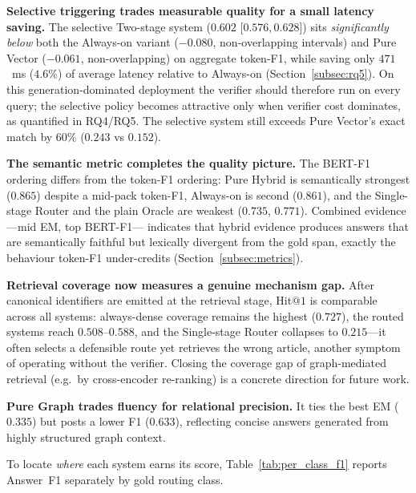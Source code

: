 \documentclass[pdflatex,sn-mathphys-num]{sn-jnl}
\begin{document}
\noindent\textbf{Selective triggering trades measurable quality for a small
latency saving.} The selective Two-stage system ($0.602$
{\scriptsize[$0.576, 0.628$]}) sits \emph{significantly below} both the
Always-on variant ($-0.080$, non-overlapping intervals) and Pure Vector
($-0.061$, non-overlapping) on aggregate token-F1, while saving only
$471$~ms ($4.6\%$) of average latency relative to Always-on
(Section~\ref{subsec:rq5}). On this generation-dominated deployment the
verifier should therefore run on every query; the selective policy becomes
attractive only when verifier cost dominates, as quantified in RQ4/RQ5. The
selective system still exceeds Pure Vector's exact match by $60\%$ ($0.243$
vs $0.152$).

\noindent\textbf{The semantic metric completes the quality picture.} The
BERT-F1 ordering differs from the token-F1 ordering: Pure Hybrid is
semantically strongest ($0.865$) despite a mid-pack token-F1, Always-on is
second ($0.861$), and the Single-stage Router and the plain Oracle are
weakest ($0.735$, $0.771$). Combined evidence---mid EM, top BERT-F1---
indicates that hybrid evidence produces answers that are semantically
faithful but lexically divergent from the gold span, exactly the behaviour
token-F1 under-credits (Section~\ref{subsec:metrics}).

\noindent\textbf{Retrieval coverage now measures a genuine mechanism gap.}
After canonical identifiers are emitted at the retrieval stage, Hit@$1$ is
comparable across all systems: always-dense coverage remains the highest
($0.727$), the routed systems reach $0.508$--$0.588$, and the Single-stage
Router collapses to $0.215$---it often selects a defensible route yet
retrieves the wrong article, another symptom of operating without the
verifier. Closing the coverage gap of graph-mediated retrieval (e.g.\ by
cross-encoder re-ranking) is a concrete direction for future work.

\noindent\textbf{Pure Graph trades fluency for relational precision.} It
ties the best EM ($0.335$) but posts a lower F1 ($0.633$), reflecting
concise answers generated from highly structured graph context.

To locate \emph{where} each system earns its score,
Table~\ref{tab:per_class_f1} reports Answer~F1 separately by gold routing
class.
\end{document}
